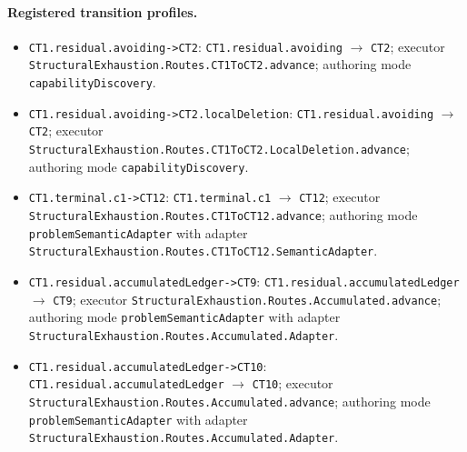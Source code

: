 \paragraph{Registered transition profiles.}
\begin{itemize}
\item \texttt{CT1.\allowbreak{}residual.\allowbreak{}avoiding-\allowbreak{}>CT2}: \texttt{CT1.\allowbreak{}residual.\allowbreak{}avoiding} $\to$ \texttt{CT2}; executor \texttt{Structural\allowbreak{}Exhaustion.\allowbreak{}Routes.\allowbreak{}CT1\allowbreak{}To\allowbreak{}CT2.\allowbreak{}advance}; authoring mode \texttt{capability\allowbreak{}Discovery}.
\item \texttt{CT1.\allowbreak{}residual.\allowbreak{}avoiding-\allowbreak{}>CT2.\allowbreak{}local\allowbreak{}Deletion}: \texttt{CT1.\allowbreak{}residual.\allowbreak{}avoiding} $\to$ \texttt{CT2}; executor \texttt{Structural\allowbreak{}Exhaustion.\allowbreak{}Routes.\allowbreak{}CT1\allowbreak{}To\allowbreak{}CT2.\allowbreak{}Local\allowbreak{}Deletion.\allowbreak{}advance}; authoring mode \texttt{capability\allowbreak{}Discovery}.
\item \texttt{CT1.\allowbreak{}terminal.\allowbreak{}c1-\allowbreak{}>CT12}: \texttt{CT1.\allowbreak{}terminal.\allowbreak{}c1} $\to$ \texttt{CT12}; executor \texttt{Structural\allowbreak{}Exhaustion.\allowbreak{}Routes.\allowbreak{}CT1\allowbreak{}To\allowbreak{}CT12.\allowbreak{}advance}; authoring mode \texttt{problem\allowbreak{}Semantic\allowbreak{}Adapter} with adapter \texttt{Structural\allowbreak{}Exhaustion.\allowbreak{}Routes.\allowbreak{}CT1\allowbreak{}To\allowbreak{}CT12.\allowbreak{}Semantic\allowbreak{}Adapter}.
\item \texttt{CT1.\allowbreak{}residual.\allowbreak{}accumulated\allowbreak{}Ledger-\allowbreak{}>CT9}: \texttt{CT1.\allowbreak{}residual.\allowbreak{}accumulated\allowbreak{}Ledger} $\to$ \texttt{CT9}; executor \texttt{Structural\allowbreak{}Exhaustion.\allowbreak{}Routes.\allowbreak{}Accumulated.\allowbreak{}advance}; authoring mode \texttt{problem\allowbreak{}Semantic\allowbreak{}Adapter} with adapter \texttt{Structural\allowbreak{}Exhaustion.\allowbreak{}Routes.\allowbreak{}Accumulated.\allowbreak{}Adapter}.
\item \texttt{CT1.\allowbreak{}residual.\allowbreak{}accumulated\allowbreak{}Ledger-\allowbreak{}>CT10}: \texttt{CT1.\allowbreak{}residual.\allowbreak{}accumulated\allowbreak{}Ledger} $\to$ \texttt{CT10}; executor \texttt{Structural\allowbreak{}Exhaustion.\allowbreak{}Routes.\allowbreak{}Accumulated.\allowbreak{}advance}; authoring mode \texttt{problem\allowbreak{}Semantic\allowbreak{}Adapter} with adapter \texttt{Structural\allowbreak{}Exhaustion.\allowbreak{}Routes.\allowbreak{}Accumulated.\allowbreak{}Adapter}.
\end{itemize}
\endgroup
